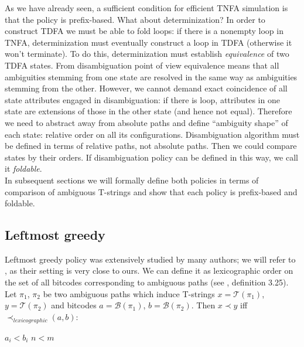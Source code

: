 \documentclass{article}
\newcommand{\Xeq}{\!=\!}
\newcommand{\XB}{\mathcal{B}}
\newcommand{\XT}{\mathcal{T}}
\theoremstyle{definition}
\begin{document}
\begin{multicols}{2}
As we have already seen, a sufficient condition for efficient TNFA simulation is that the policy is prefix-based.
What about determinization?
In order to construct TDFA we must be able to fold loops:
if there is a nonempty loop in TNFA, determinization must eventually construct a loop in TDFA
(otherwise it won't terminate).
To do this, determinization must establish \emph{equivalence} of two TDFA states.
From disambiguation point of view equivalence means that all ambiguities stemming from one state
are resolved in the same way as ambiguities stemming from the other.
However, we cannot demand exact coincidence of all state attributes engaged in disambiguation:
if there is loop, attributes in one state are extensions of those in the other state (and hence not equal).
Therefore we need to abstract away from absolute paths and define ``ambiguity shape'' of each state: relative order on all its configurations.
Disambiguation algorithm must be defined in terms of relative paths, not absolute paths.
Then we could compare states by their orders.
If disambiguation policy can be defined in this way, we call it \emph{foldable}.
\\

In subsequent sections we will formally define both policies in terms of comparison of ambiguous T-strings
and show that each policy is prefix-based and foldable.

\subsection*{Leftmost greedy}

Leftmost greedy policy was extensively studied by many authors; we will refer to \cite{Gra15}, as their setting is very close to ours.
We can define it as lexicographic order on the set of all bitcodes corresponding to ambiguous paths
(see \cite{Gra15}, definition 3.25).
Let $\pi_1$, $\pi_2$ be two ambiguous paths which induce T-strings $x \Xeq \XT(\pi_1)$, $y \Xeq \XT(\pi_2)$
and bitcodes $a \Xeq \XB(\pi_1)$, $b \Xeq \XB(\pi_2)$.
Then $x \prec y$ iff $\prec_{lexicographic} (a, b)$:
\\

    \begin{algorithm}[H] \DontPrintSemicolon {} 
     {
        \For {$i \Xeq \overline{1, min(n, m)}$} {
             { \Return $a_i \!<\! b_i$  }
        }
        \Return $n \!<\! m$ \;
    }
    \end{algorithm}


\end{multicols}
\end{document}
